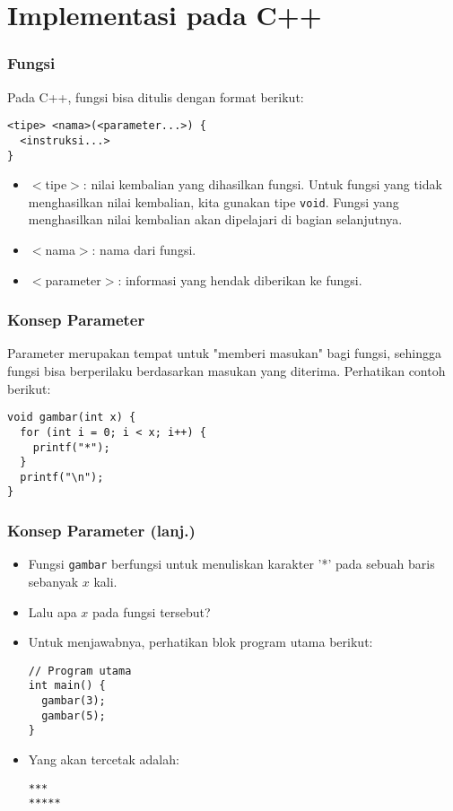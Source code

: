 \section{Implementasi pada C++}
\frame{\sectionpage}

\begin{frame}[fragile]
\frametitle{Fungsi}
Pada C++, fungsi bisa ditulis dengan format berikut:
\begin{lstlisting}
<tipe> <nama>(<parameter...>) {
  <instruksi...>
}
\end{lstlisting}
\begin{itemize}
  \item $<$tipe$>$: nilai kembalian yang dihasilkan fungsi. Untuk fungsi yang tidak menghasilkan nilai kembalian, kita gunakan tipe \texttt{void}. Fungsi yang menghasilkan nilai kembalian akan dipelajari di bagian selanjutnya.
  \item $<$nama$>$: nama dari fungsi.
  \item $<$parameter$>$: informasi yang hendak diberikan ke fungsi.
\end{itemize}
\end{frame}

\begin{frame}[fragile]
\frametitle{Konsep Parameter}
Parameter merupakan tempat untuk "memberi masukan" bagi fungsi, sehingga fungsi bisa berperilaku berdasarkan masukan yang diterima.
\vfill
Perhatikan contoh berikut:
\begin{lstlisting}
void gambar(int x) {
  for (int i = 0; i < x; i++) {
    printf("*");
  }
  printf("\n");
}
\end{lstlisting}
\end{frame}

\begin{frame}[fragile]
\frametitle{Konsep Parameter (lanj.)}
\begin{itemize}
  \item Fungsi \texttt{gambar} berfungsi untuk menuliskan karakter '*' pada sebuah baris sebanyak $x$ kali.
  \item Lalu apa $x$ pada fungsi tersebut?
  \item Untuk menjawabnya, perhatikan blok program utama berikut:
\begin{lstlisting}
// Program utama
int main() {
  gambar(3);
  gambar(5);
}
\end{lstlisting}
  \item Yang akan tercetak adalah:
\begin{lstlisting}
***
*****
\end{lstlisting}
\end{itemize}
\end{frame}

